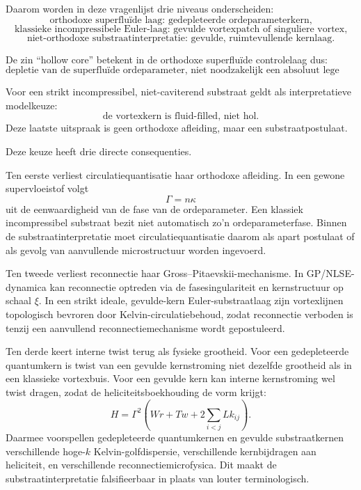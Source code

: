 \documentclass[11pt]{article}
\begin{document}
        Daarom worden in deze vragenlijst drie niveaus onderscheiden:
        \[
            \text{orthodoxe superfluïde laag: gedepleteerde ordeparameterkern,}
        \]
        \[
            \text{klassieke incompressibele Euler-laag: gevulde vortexpatch of singuliere vortex,}
        \]
        \[
            \text{niet-orthodoxe substraatinterpretatie: gevulde, ruimtevullende kernlaag.}
        \]
        
        De zin ``hollow core'' betekent in de orthodoxe superfluïde controlelaag dus:
        \[
            \boxed{
                \text{depletie van de superfluïde ordeparameter, niet noodzakelijk een absoluut lege kern.}
            }
        \]
        
        Voor een strikt incompressibel, niet-caviterend substraat geldt als interpretatieve modelkeuze:
        \[
            \boxed{
                \text{de vortexkern is fluid-filled, niet hol.}
            }
        \]
        Deze laatste uitspraak is geen orthodoxe afleiding, maar een substraatpostulaat.
        
        Deze keuze heeft drie directe consequenties.
        
        Ten eerste verliest circulatiequantisatie haar orthodoxe afleiding. In een gewone supervloeistof volgt
        \[
            \Gamma=n\kappa
        \]
        uit de eenwaardigheid van de fase van de ordeparameter. Een klassiek incompressibel substraat bezit niet automatisch zo'n ordeparameterfase. Binnen de substraatinterpretatie moet circulatiequantisatie daarom als apart postulaat of als gevolg van aanvullende microstructuur worden ingevoerd.
        
        Ten tweede verliest reconnectie haar Gross--Pitaevskii-mechanisme. In GP/NLSE-dynamica kan reconnectie optreden via de fasesingulariteit en kernstructuur op schaal \(\xi\). In een strikt ideale, gevulde-kern Euler-substraatlaag zijn vortexlijnen topologisch bevroren door Kelvin-circulatiebehoud, zodat reconnectie verboden is tenzij een aanvullend reconnectiemechanisme wordt gepostuleerd.
        
        Ten derde keert interne twist terug als fysieke grootheid. Voor een gedepleteerde quantumkern is twist van een gevulde kernstroming niet dezelfde grootheid als in een klassieke vortexbuis. Voor een gevulde kern kan interne kernstroming wel twist dragen, zodat de heliciteitsboekhouding de vorm krijgt:
        \[
            H
            =
            \Gamma^2
            \left(
            Wr
            +
            Tw
            +
            2\sum_{i<j}Lk_{ij}
            \right).
        \]
        Daarmee voorspellen gedepleteerde quantumkernen en gevulde substraatkernen verschillende hoge-\(k\) Kelvin-golfdispersie, verschillende kernbijdragen aan heliciteit, en verschillende reconnectiemicrofysica. Dit maakt de substraatinterpretatie falsifieerbaar in plaats van louter terminologisch.
\end{document}
